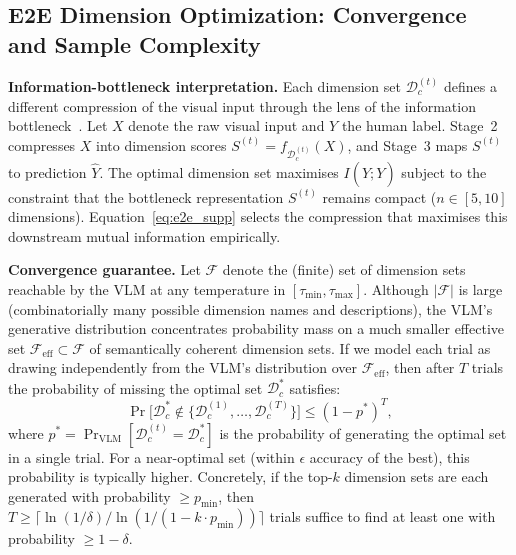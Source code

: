 \documentclass[runningheads]{llncs}
\begin{document}
\subsection{E2E Dimension Optimization: Convergence and Sample Complexity}
\label{sec:theory_e2e}

\noindent\textbf{Information-bottleneck interpretation.}
Each dimension set $\mathcal{D}_c^{(t)}$ defines a different compression of the visual input through the lens of the information bottleneck~\cite{tishby2000information}.
Let $X$ denote the raw visual input and $Y$ the human label.
Stage~2 compresses $X$ into dimension scores $S^{(t)}=f_{\mathcal{D}_c^{(t)}}(X)$, and Stage~3 maps $S^{(t)}$ to prediction $\hat{Y}$.
The optimal dimension set maximises $I(\hat{Y}; Y)$ subject to the constraint that the bottleneck representation $S^{(t)}$ remains compact ($n \in [5,10]$ dimensions).
Equation~\eqref{eq:e2e_supp} selects the compression that maximises this downstream mutual information empirically.

\smallskip\noindent\textbf{Convergence guarantee.}
Let $\mathcal{F}$ denote the (finite) set of dimension sets reachable by the VLM at any temperature in $[\tau_{\min}, \tau_{\max}]$.
Although $|\mathcal{F}|$ is large (combinatorially many possible dimension names and descriptions), the VLM's generative distribution concentrates probability mass on a much smaller effective set $\mathcal{F}_{\mathrm{eff}} \subset \mathcal{F}$ of semantically coherent dimension sets.
If we model each trial as drawing independently from the VLM's distribution over $\mathcal{F}_{\mathrm{eff}}$, then after $T$ trials the probability of missing the optimal set $\mathcal{D}_c^*$ satisfies:
\begin{equation}
\Pr\bigl[\mathcal{D}_c^* \notin \{\mathcal{D}_c^{(1)}, \ldots, \mathcal{D}_c^{(T)}\}\bigr] \leq (1 - p^*)^T,
\label{eq:convergence_theory}
\end{equation}
where $p^* = \Pr_{\mathrm{VLM}}[\mathcal{D}_c^{(t)} = \mathcal{D}_c^*]$ is the probability of generating the optimal set in a single trial.
For a near-optimal set (within $\epsilon$ accuracy of the best), this probability is typically higher.
Concretely, if the top-$k$ dimension sets are each generated with probability $\geq p_{\min}$, then $T \geq \lceil \ln(1/\delta) / \ln(1/(1-k \cdot p_{\min})) \rceil$ trials suffice to find at least one with probability $\geq 1-\delta$.
\end{document}

